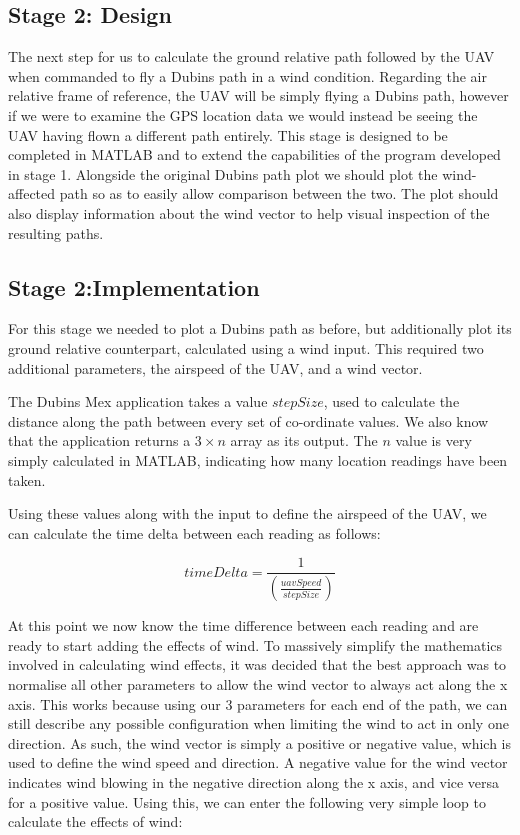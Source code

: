 \subsection{Stage 2: Design}
\label{task1:stage2:design}

The next step for us to calculate the ground relative path followed by the UAV when commanded to fly a Dubins path in a wind condition. Regarding the air relative frame of reference, the UAV will be simply flying a Dubins path, however if we were to examine the GPS location data we would instead be seeing the UAV having flown a different path entirely. This stage is designed to be completed in MATLAB and to extend the capabilities of the program developed in stage 1. Alongside the original Dubins path plot we should plot the wind-affected path so as to easily allow comparison between the two. The plot should also display information about the wind vector to help visual inspection of the resulting paths. 

\subsection{Stage 2:Implementation}
\label{task1:stage2:implementation}

For this stage we needed to plot a Dubins path as before, but additionally plot its ground relative counterpart, calculated using a wind input. This required two additional parameters, the airspeed of the UAV, and a wind vector. 

The Dubins Mex application takes a value $stepSize$, used to calculate the distance along the path between every set of co-ordinate values. We also know that the application returns a $3 \times n$ array as its output. The $n$ value is very simply calculated in MATLAB, indicating how many location readings have been taken.

Using these values along with the input to define the airspeed of the UAV, we can calculate the time delta between each reading as follows:

\begin{equation}
	timeDelta = \frac{1}{(\frac{uavSpeed}{stepSize})}
\end{equation}

At this point we now know the time difference between each reading and are ready to start adding the effects of wind. To massively simplify the mathematics involved in calculating wind effects, it was decided that the best approach was to normalise all other parameters to allow the wind vector to always act along the x axis. This works because using our 3 parameters for each end of the path, we can still describe any possible configuration when limiting the wind to act in only one direction. As such, the wind vector is simply a positive or negative value, which is used to define the wind speed and direction. A negative value for the wind vector indicates wind blowing in the negative direction along the x axis, and vice versa for a positive value. Using this, we can enter the following very simple loop to calculate the effects of wind:


